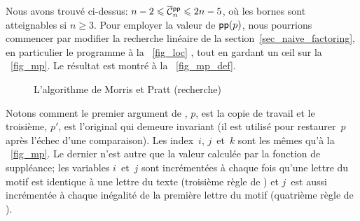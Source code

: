 \vspace*{-20pt}


Nous avons trouvé ci-dessus: \(n-2 \leqslant \OC{\fun{pp}}{n}
\leqslant 2n - 5\), où les bornes sont atteignables si \(n \geqslant
3\). Pour employer la valeur de \(\textsf{pp}(p)\), nous pourrions
commencer par modifier la recherche linéaire de la
section~\ref{sec_naive_factoring}, en particulier le programme à la
\fig~\ref{fig_loc} , tout en gardant un {\oe}il sur
la \fig~\vref{fig_mp}. Le résultat est montré à la
\fig~\vref{fig_mp_def}.
\begin{figure}[b]
\centering
\abovedisplayskip=0pt
\belowdisplayskip=0pt
\caption{L'algorithme de Morris et Pratt (recherche)\label{fig_mp_def}}
\end{figure}
Notons comment le premier argument de ,
\(p\), est la copie de travail et le troisième, \(p'\), est l'original
qui demeure invariant (il est utilisé pour restaurer~\(p\) après
l'échec d'une comparaison). Les index~\(i\), \(j\)~et~\(k\) sont les
mêmes qu'à la \fig~\vref{fig_mp}. Le dernier n'est autre que la valeur
calculée par la fonction de suppléance; les variables \(i\)~et~\(j\)
sont incrémentées à chaque fois qu'une lettre du motif est identique à
une lettre du texte (troisième règle de ) et \(j\)~est aussi
incrémentée à chaque inégalité de la première lettre du motif
(quatrième règle de ).


